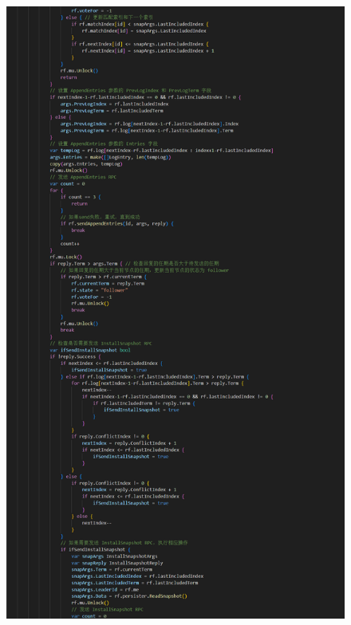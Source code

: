 \documentclass[]{article}
\begin{document}
\begin{itemize}
\begin{figure}[H]
			\includegraphics[height=1\textheight]{./2D/Start2.png}
		\end{figure}
		\begin{figure}[H]
			\centering

\end{figure}
\end{itemize}
\end{document}
